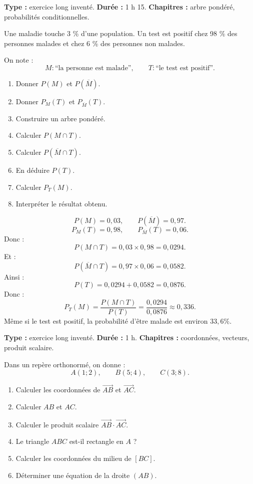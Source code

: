 \documentclass[11pt,a4paper]{article}
\begin{document}
\hypertarget{P-SUJET-08}{}
\begin{sujettype}
\textbf{Type :} exercice long inventé.  
\textbf{Durée :} 1 h 15.  
\textbf{Chapitres :} arbre pondéré, probabilités conditionnelles.

Une maladie touche 3 \% d'une population.  
Un test est positif chez 98 \% des personnes malades et chez 6 \% des personnes non malades.

On note :
\[
M : \text{``la personne est malade''},
\qquad
T : \text{``le test est positif''}.
\]

\begin{enumerate}
  \item Donner $P(M)$ et $P(\overline M)$.
  \item Donner $P_M(T)$ et $P_{\overline M}(T)$.
  \item Construire un arbre pondéré.
  \item Calculer $P(M\cap T)$.
  \item Calculer $P(\overline M\cap T)$.
  \item En déduire $P(T)$.
  \item Calculer $P_T(M)$.
  \item Interpréter le résultat obtenu.
\end{enumerate}
\end{sujettype}

\begin{corrige}[P-SUJET-08]
\[
P(M)=0{,}03,
\qquad
P(\overline M)=0{,}97.
\]
\[
P_M(T)=0{,}98,
\qquad
P_{\overline M}(T)=0{,}06.
\]
Donc :
\[
P(M\cap T)=0{,}03\times0{,}98=0{,}0294.
\]
Et :
\[
P(\overline M\cap T)=0{,}97\times0{,}06=0{,}0582.
\]
Ainsi :
\[
P(T)=0{,}0294+0{,}0582=0{,}0876.
\]
Donc :
\[
P_T(M)=\frac{P(M\cap T)}{P(T)}
=\frac{0{,}0294}{0{,}0876}
\approx0{,}336.
\]
Même si le test est positif, la probabilité d'être malade est environ $33{,}6\%$.
\end{corrige}

\hypertarget{P-SUJET-09}{}
\begin{sujettype}
\textbf{Type :} exercice long inventé.  
\textbf{Durée :} 1 h.  
\textbf{Chapitres :} coordonnées, vecteurs, produit scalaire.

Dans un repère orthonormé, on donne :
\[
A(1;2),\qquad B(5;4),\qquad C(3;8).
\]

\begin{enumerate}
  \item Calculer les coordonnées de $\overrightarrow{AB}$ et $\overrightarrow{AC}$.
  \item Calculer $AB$ et $AC$.
  \item Calculer le produit scalaire $\overrightarrow{AB}\cdot\overrightarrow{AC}$.
  \item Le triangle $ABC$ est-il rectangle en $A$ ?
  \item Calculer les coordonnées du milieu de $[BC]$.
  \item Déterminer une équation de la droite $(AB)$.
\end{enumerate}
\end{sujettype}
\end{document}
